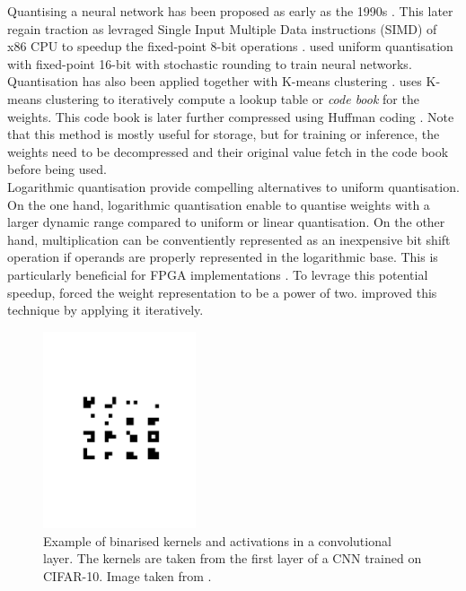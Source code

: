 Quantising a neural network has been proposed as early as the 1990s
\cite{balzer1991weight,fiesler1990weight}. This later regain traction as
\citeauthor{37631} levraged Single Input Multiple Data instructions (SIMD) of
x86 CPU to speedup the fixed-point 8-bit operations \cite{37631}.
\citeauthor{gupta2015deep} used uniform quantisation with fixed-point 16-bit
with stochastic rounding to train neural networks. Quantisation has also been
applied together with K-means clustering \cite{steinhaus1956division}.
\cite{DBLP:journals/corr/HanMD15} uses K-means clustering to iteratively compute
a lookup table or \emph{code book} for the weights. This code book is later
further compressed using Huffman coding \cite{huffman1952method}. Note that this
method is mostly useful for storage, but for training or inference, the weights
need to be decompressed and their original value fetch in the code book before
being used.\\

Logarithmic quantisation provide compelling alternatives to uniform
quantisation. On the one hand, logarithmic quantisation enable to quantise
weights with a larger dynamic range compared to uniform or linear quantisation.
On the other hand, multiplication can be conventiently represented as an
inexpensive bit shift operation if operands are properly represented in the
logarithmic base. This is particularly beneficial for \ac{FPGA} implementations
\cite{alemdar2017ternary}. To levrage this potential speedup,
\cite{DBLP:journals/corr/LinCMB15} forced the weight representation to be a
power of two. \cite{DBLP:conf/iclr/ZhouYGXC17} improved this technique by
applying it iteratively.\\

\begin{figure}[htbp]
    \centering
    \includegraphics[width=0.40\textwidth,trim=5cm 9cm 5cm 9cm, clip]{chapter_sota/assets/binarised_kernels.pdf}
    \caption{Example of binarised kernels and activations in a convolutional
    layer. The kernels are taken from the first layer of a \ac{CNN} trained on CIFAR-10.
    Image taken from \cite{DBLP:conf/nips/HubaraCSEB16}.}
    \label{fig:sota:binarised_kernels}
\end{figure}

